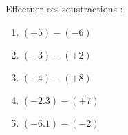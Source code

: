
\begin{exercice}\label{exo2smath-0214}

    Effectuer ces soustractions :
    \begin{multicols}{2}
        \begin{enumerate}
            \item
                \( (+5)-(-6)\)
            \item
                \( (-3)-(+2)\)
            \item
                \( (+4)-(+8)\)

            \item
                \( (-2.3)-(+7)\)
            \item
                \( (+6.1)-(-2)\)
        \end{enumerate}
    \end{multicols}

\end{exercice}
